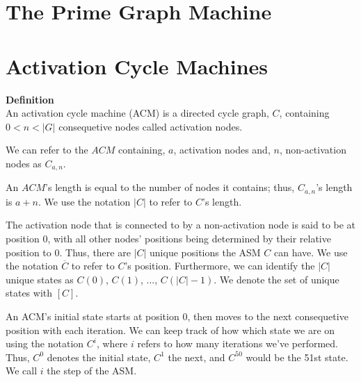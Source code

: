 \documentclass[a4paper,12pt]{article}
\begin{document}
\section{The Prime Graph Machine}


\section{Activation Cycle Machines}


\textbf{Definition} \\
An activation cycle machine (ACM) is a directed cycle graph, $C$, containing $0 < n < |G|$ consequetive nodes called activation nodes.

We can refer to the $ACM$ containing, $a$, activation nodes and, $n$, non-activation nodes as $C_{a,n}$.
 
An $ACM$'s length is equal to the number of nodes it contains; thus, $C_{a,n}$'s length is $a + n$. We use the notation $|C|$ to refer to $C$'s length. 

The activation node that is connected to by a non-activation node is said to be at position $0$, with all other nodes' positions being determined by their relative position to $0$. Thus, there are $|C|$ unique positions the ASM $C$ can have. We use the notation $\overline{C}$ to refer to $C$'s position. Furthermore, we can identify the $|C|$ unique states as $C(0)$, $C(1)$, ..., $C(|C| - 1)$. We denote the set of unique states with $[C].$

An ACM's initial state starts at position $0$, then moves to the next consequetive position with each iteration. We can keep track of how which state we are on using the notation $C^i$, where $i$ refers to how many iterations we've performed. Thus, $C^0$ denotes the initial state, $C^1$ the next, and $C^{50}$ would be the 51st state. We call $i$ the step of the ASM.
\end{document}
